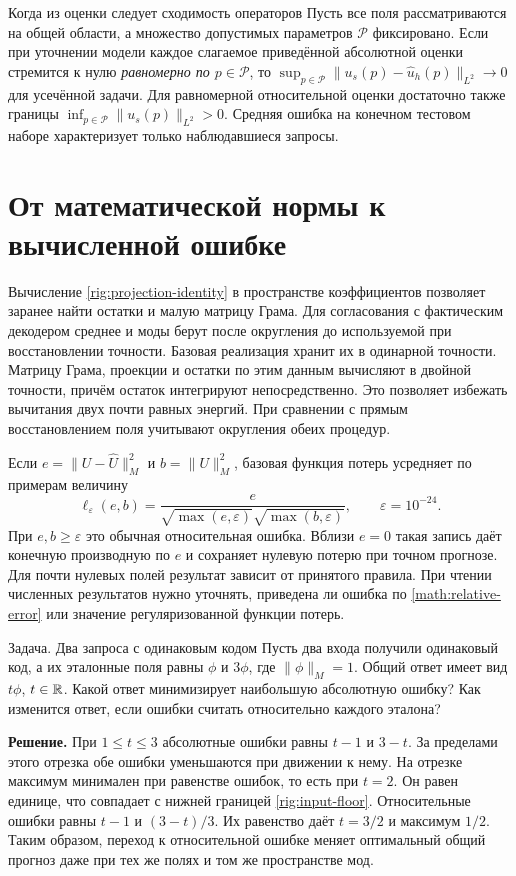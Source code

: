 \begin{idea}{Когда из оценки следует сходимость операторов}
Пусть все поля рассматриваются на общей области, а множество допустимых
параметров $\mathcal P$ фиксировано. Если при уточнении модели каждое
слагаемое приведённой абсолютной оценки стремится к нулю \emph{равномерно
по $p\in\mathcal P$}, то
$\sup_{p\in\mathcal P}\|u_s(p)-\widehat u_h(p)\|_{L^2}\to0$ для
усечённой задачи. Для равномерной относительной оценки достаточно также
границы $\inf_{p\in\mathcal P}\|u_s(p)\|_{L^2}>0$. Средняя ошибка на
конечном тестовом наборе характеризует только наблюдавшиеся запросы.
\end{idea}

\section{От математической нормы к вычисленной ошибке}
\label{rig:floating}
Вычисление \eqref{rig:projection-identity} в пространстве коэффициентов
позволяет заранее найти остатки и малую матрицу Грама. Для согласования
с фактическим декодером среднее и моды берут после округления до используемой
при восстановлении точности. Базовая реализация хранит их в одинарной
точности. Матрицу Грама, проекции и остатки по этим данным вычисляют
в двойной точности, причём остаток интегрируют непосредственно.
Это позволяет избежать вычитания двух почти равных энергий. При сравнении
с прямым восстановлением поля учитывают округления обеих процедур.

Если $e=\|U-\widehat U\|_M^2$ и $b=\|U\|_M^2$, базовая функция потерь
усредняет по примерам величину
\begin{equation}
 \ell_\varepsilon(e,b)=
 \frac{e}{\sqrt{\max(e,\varepsilon)}\sqrt{\max(b,\varepsilon)}},
 \qquad \varepsilon=10^{-24}.\label{rig:regularized-loss}
\end{equation}
При $e,b\ge\varepsilon$ это обычная относительная ошибка.
Вблизи $e=0$ такая запись даёт конечную производную по $e$ и сохраняет
нулевую потерю при точном прогнозе. Для почти нулевых полей результат
зависит от принятого правила. При чтении численных результатов нужно
уточнять, приведена ли ошибка по \eqref{math:relative-error} или значение
регуляризованной функции потерь.

\begin{worked}{Задача. Два запроса с одинаковым кодом}
Пусть два входа получили одинаковый код, а их эталонные поля равны
$\phi$ и $3\phi$, где $\|\phi\|_M=1$. Общий ответ имеет вид $t\phi$,
$t\in\mathbb{R}$. Какой ответ минимизирует наибольшую абсолютную ошибку?
Как изменится ответ, если ошибки считать относительно каждого эталона?

\textbf{Решение.} При $1\le t\le3$ абсолютные ошибки равны $t-1$ и
$3-t$. За пределами этого отрезка обе ошибки уменьшаются при движении
к нему. На отрезке максимум минимален при равенстве ошибок, то есть при
$t=2$. Он равен единице, что совпадает с нижней границей
\eqref{rig:input-floor}. Относительные ошибки равны $t-1$ и $(3-t)/3$.
Их равенство даёт $t=3/2$ и максимум $1/2$. Таким образом, переход к
относительной ошибке меняет оптимальный общий прогноз даже при тех же
полях и том же пространстве мод.
\end{worked}
